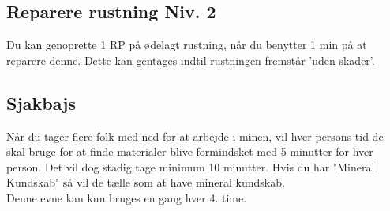 \subsection{Reparere rustning Niv. 2}
Du kan genoprette 1 RP på ødelagt rustning, når du benytter 1 min på at reparere denne. Dette kan gentages indtil rustningen fremstår 'uden skader'.\\

\subsection{Sjakbajs}
Når du tager flere folk med ned for at arbejde i minen, vil hver persons tid de skal bruge for at finde materialer blive formindsket med 5 minutter for hver person. Det vil dog stadig tage minimum 10 minutter. Hvis du har "Mineral Kundskab" så vil de tælle som at have mineral kundskab.\\
Denne evne kan kun bruges en gang hver 4. time. 